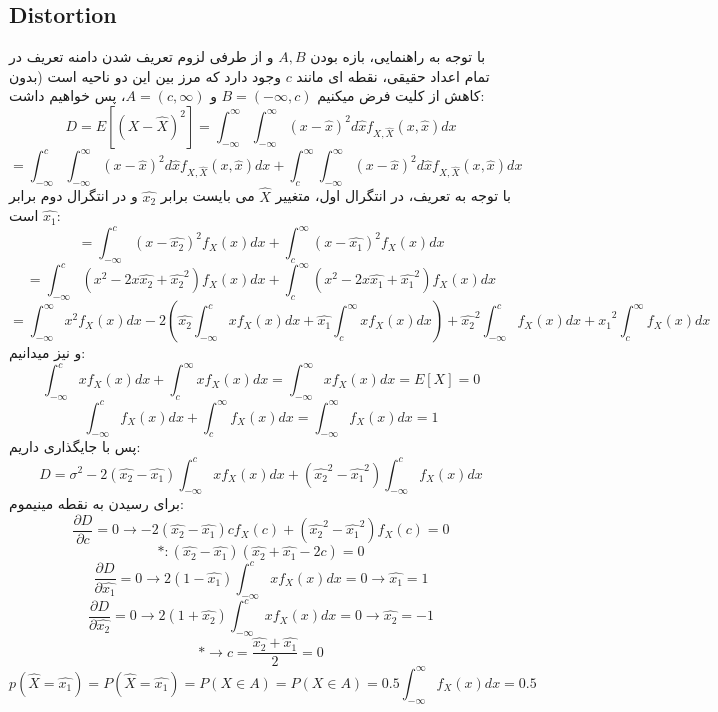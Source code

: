 \documentclass[a4paper,12pt]{article}
\begin{document}
\subsection{Distortion}
با توجه به راهنمایی، بازه بودن $A,B$ و از طرفی لزوم تعریف شدن دامنه تعریف در تمام اعداد حقیقی، نقطه ای مانند $c$ وجود دارد که مرز بین این دو ناحیه است (بدون کاهش از کلیت فرض میکنیم $B = (-\infty, c)$ و $A = (c, \infty)$، پس خواهیم داشت:
$$
D = E[(X-\hat{X})^2] = \int_{-\infty}^{\infty} \int_{-\infty}^{\infty} (x-\hat{x})^2 d\hat{x}f_{X,\hat{X}}(x,\hat{x})dx
$$
$$
= \int_{-\infty}^{c} \int_{-\infty}^{\infty} (x-\hat{x})^2 d\hat{x}f_{X,\hat{X}}(x,\hat{x})dx + \int_{c}^{\infty} \int_{-\infty}^{\infty} (x-\hat{x})^2 d\hat{x}f_{X,\hat{X}}(x,\hat{x})dx
$$
با توجه به تعریف، در انتگرال اول، متغییر $\hat{X}$ می بایست برابر $\hat{x_2}$ و در انتگرال دوم برابر $\hat{x_1}$ است:
$$
= \int_{-\infty}^{c} (x-\hat{x_2})^2 f_X(x) dx + \int_{c}^{\infty}(x-\hat{x_1})^2 f_X(x) dx
$$
$$
= \int_{-\infty}^{c} (x^2 - 2x\hat{x_2}+\hat{x_2}^2) f_X(x)dx + \int_{c}^{\infty}(x^2 -2x\hat{x_1} +\hat{x_1}^2) f_X(x) dx
$$
$$
= \int_{-\infty}^{\infty} x^2 f_X(x) dx - 2(\hat{x_2} \int_{-\infty}^{c} x f_X(x) dx + \hat{x_1} \int_{c}^{\infty} x f_X(x) dx) +  \hat{x_2}^2 \int_{-\infty}^{c} f_X(x) dx + \hat{x_1}^2 \int_{c}^{\infty} f_X(x) dx
$$
و نیز میدانیم:
$$
\int_{-\infty}^{c} x f_X(x) dx + \int_{c}^{\infty} x f_X(x) dx = \int_{-\infty}^{\infty} x f_X(x) dx = E[X] = 0 
$$
$$
\int_{-\infty}^{c} f_X(x) dx + \int_{c}^{\infty} f_X(x) dx = \int_{-\infty}^{\infty} f_X(x) dx = 1
$$
پس با جایگذاری داریم:
$$
D = \sigma^2 -2(\hat{x_2} - \hat{x_1}) \int_{-\infty}^{c} x f_X(x) dx + (\hat{x_2}^2 - \hat{x_1}^2) \int_{-\infty}^{c} f_X(x) dx
$$
برای رسیدن به نقطه مینیموم:
$$
\frac{\partial D}{\partial c} = 0 \rightarrow -2(\hat{x_2} - \hat{x_1})cf_X(c) +  (\hat{x_2}^2 - \hat{x_1}^2) f_X(c) = 0
$$
$$
*:(\hat{x_2} - \hat{x_1})(\hat{x_2} + \hat{x_1} - 2c) = 0
$$
$$
\frac{\partial D}{\partial \hat{x_1}} = 0 \rightarrow 2(1 -\hat{x_1})\int_{-\infty}^{c} x f_X(x) dx = 0 \rightarrow \hat{x_1} = 1
$$
$$
\frac{\partial D}{\partial \hat{x_2}} = 0 \rightarrow 2(1 +\hat{x_2})\int_{-\infty}^{c} x f_X(x) dx = 0 \rightarrow \hat{x_2} = -1 
$$
$$
* \rightarrow c = \frac{\hat{x_2} + \hat{x_1}}{2} = 0
$$
$$
p(\hat{X} = \hat{x_1})=P(\hat{X} = \hat{x_1}) = P(X \in A) = P(X \in A) =  0.5 \int_{-\infty}^{\infty} f_X(x) dx = 0.5
$$
\end{document}
